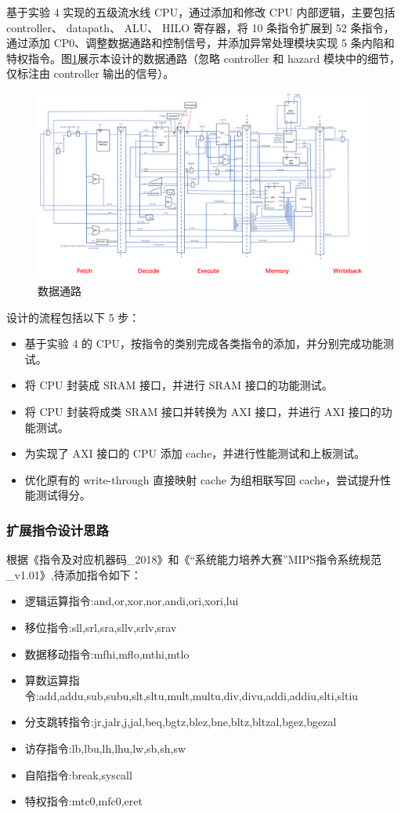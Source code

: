 基于实验 4 实现的五级流水线 CPU，通过添加和修改 CPU 内部逻辑，主要包括 controller、 datapath、 ALU、 HILO 寄存器，将 10 条指令扩展到 52 条指令，通过添加 CP0、调整数据通路和控制信号，并添加异常处理模块实现 5 条内陷和特权指令。图\ref{fig:datapath}展示本设计的数据通路（忽略 controller 和 hazard 模块中的细节，仅标注由 controller 输出的信号）。

\begin{figure}[H]
    \centering
    \includegraphics[width=1\linewidth]{image/datapath.png}
    \caption{数据通路}
    \label{fig:datapath}
\end{figure}

设计的流程包括以下 5 步：

\begin{itemize}
    \item 基于实验 4 的 CPU，按指令的类别完成各类指令的添加，并分别完成功能测试。
    \item 将 CPU 封装成 SRAM 接口，并进行 SRAM 接口的功能测试。
    \item 将 CPU 封装将成类 SRAM 接口并转换为 AXI 接口，并进行 AXI 接口的功能测试。
    \item 为实现了 AXI 接口的 CPU 添加 cache，并进行性能测试和上板测试。
    \item 优化原有的 write-through 直接映射 cache 为组相联写回 cache，尝试提升性能测试得分。
\end{itemize}

\subsubsection{扩展指令设计思路}
根据《指令及对应机器码\_2018》和《“系统能力培养大赛”MIPS指令系统规范\_v1.01》,待添加指令如下：
\begin{itemize}
 \item 逻辑运算指令:and,or,xor,nor,andi,ori,xori,lui
 \item 移位指令:sll,srl,sra,sllv,srlv,srav
 \item 数据移动指令:mfhi,mflo,mthi,mtlo
 \item 算数运算指令:add,addu,sub,subu,slt,sltu,mult,multu,div,divu,addi,addiu,slti,sltiu
 \item 分支跳转指令:jr,jalr,j,jal,beq,bgtz,blez,bne,bltz,bltzal,bgez,bgezal
 \item 访存指令:lb,lbu,lh,lhu,lw,sb,sh,sw
 \item 自陷指令:break,syscall
 \item 特权指令:mtc0,mfc0,eret
\end{itemize}

